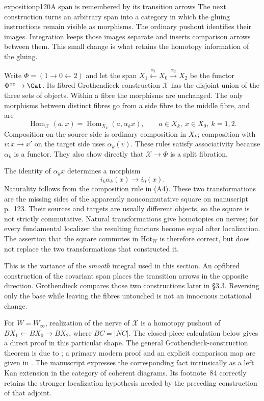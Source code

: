\begin{dcomment}{exposition}{p120}{A span is remembered by its transition arrows}
The next construction turns an arbitrary span into a category in which the gluing instructions remain visible as morphisms.  The ordinary pushout identifies their images.  Integration keeps those images separate and inserts comparison arrows between them.  This small change is what retains the homotopy information of the gluing.

Write $\Phi=(1\to0\leftarrow2)$ and let the span $X_1\xleftarrow{\alpha_1}X_0\xrightarrow{\alpha_2}X_2$ be the functor $\Phi^{\mathrm{op}}\to\Cat$.  Its fibred Grothendieck construction $\mathcal X$ has the disjoint union of the three sets of objects.  Within a fibre the morphisms are unchanged.  The only morphisms between distinct fibres go from a side fibre to the middle fibre, and are
\[
 \operatorname{Hom}_{\mathcal X}(a,x)
     =\operatorname{Hom}_{X_k}(a,\alpha_kx),
 \qquad a\in X_k,\ x\in X_0,\ k=1,2.
 \tag{A4}
\]
Composition on the source side is ordinary composition in $X_k$; composition with $v:x\to x'$ on the target side uses $\alpha_k(v)$.  These rules satisfy associativity because $\alpha_k$ is a functor.  They also show directly that $\mathcal X\to\Phi$ is a split fibration.

The identity of $\alpha_kx$ determines a morphism
\[
 i_k\alpha_k(x)\longrightarrow i_0(x).
\]
Naturality follows from the composition rule in (A4).  These two transformations are the missing sides of the apparently noncommutative square on manuscript p.~123.  Their sources and targets are usually different objects, so the square is not strictly commutative.  Natural transformations give homotopies on nerves; for every fundamental localizer the resulting functors become equal after localization.  The assertion that the square commutes in $\mathrm{Hot}_W$ is therefore correct, but does not replace the two transformations that constructed it.

This is the variance of the \emph{smooth} integral used in this section.  An opfibred construction of the covariant span places the transition arrows in the opposite direction.  Grothendieck compares those two constructions later in \S3.3.  Reversing only the base while leaving the fibres untouched is not an innocuous notational change.

For $W=W_\infty$, realization of the nerve of $\mathcal X$ is a homotopy pushout of $BX_1\leftarrow BX_0\to BX_2$, where $BC=|NC|$.  The closed-piece calculation below gives a direct proof in this particular shape.  The general Grothendieck-construction theorem is due to \citet[Theorem~1.2]{Thomason1979}; a primary modern proof and an explicit comparison map are given in \citet[\S3, equation~(9) and Theorem~3]{Cegarra2020}.  The manuscript expresses the corresponding fact intrinsically as a left Kan extension in the category of coherent diagrams.  Its footnote~84 correctly retains the stronger localization hypothesis needed by the preceding construction of that adjoint.
\end{dcomment}
